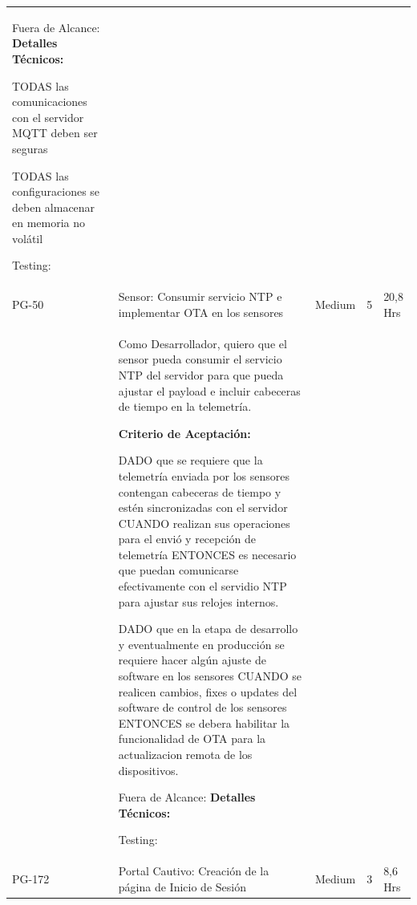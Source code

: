 \documentclass[11pt]{charter}
\begin{document}
\begin{landscape}
\begin{tabularx}{\linewidth}{@{}|p{1.3cm}|p{17cm}|p{1.7cm}|p{1.5cm}|p{1.7cm}|@{}}
\begin{description}
                   \item Fuera de Alcance:                 
                   \textbf{Detalles Técnicos:} 
                         \item TODAS las comunicaciones con el servidor MQTT deben ser seguras 
                         \item TODAS las configuraciones se deben almacenar en memoria no volátil                 
                   \item Testing: 
            \end{description}            &  &     & \\
PG-50    & Sensor: Consumir servicio NTP e   implementar OTA en los sensores  & Medium             & 5   & 20,8  Hrs         \\
         &  \begin{description}                 
                   \item Como Desarrollador, quiero que   el sensor pueda consumir el servicio NTP del servidor para que pueda ajustar   el payload e incluir cabeceras de tiempo en la telemetría.                 
                   \item \textbf{Criterio de Aceptación:}                 
                   \item DADO que se requiere que la telemetría enviada por los sensores contengan   cabeceras de tiempo y estén sincronizadas con el servidor CUANDO realizan sus operaciones para el envió y recepción de   telemetría ENTONCES es necesario que puedan comunicarse efectivamente con el servidio   NTP para ajustar sus relojes internos.                 
                   \item DADO que en la etapa de desarrollo y eventualmente en producción se   requiere hacer algún ajuste de software en los sensores CUANDO se realicen cambios, fixes o updates del software de control de los   sensores ENTONCES se debera habilitar la funcionalidad de OTA para la actualizacion   remota de los dispositivos.             
                   \item Fuera de Alcance:                 
                   \textbf{Detalles Técnicos:}                 
                   \item Testing:  
            \end{description}        &  &     & \\
PG-172   & Portal Cautivo: Creación de la   página de Inicio de Sesión        & Medium             & 3   & 8,6  Hrs          \\

\end{tabularx}
\end{landscape}
\end{document}
